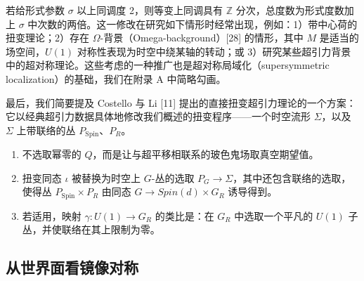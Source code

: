 若给形式参数 $\sigma$ 以上同调度 2，则等变上同调具有 $\mathbb{Z}$ 分次，总度数为形式度数加上 $\sigma$ 中次数的两倍。这一修改在研究如下情形时经常出现，例如：1）带中心荷的扭变理论；2）存在 $\Omega$-背景（Omega-background）[28] 的情形，其中 $M$ 是适当的场空间，$U(1)$ 对称性表现为时空中绕某轴的转动；或 3）研究某些超引力背景中的超对称理论。这些考虑的一种推广也是超对称局域化（supersymmetric localization）的基础，我们在附录 A 中简略勾画。

最后，我们简要提及 Costello 与 Li [11] 提出的直接扭变超引力理论的一个方案：它以经典超引力数据具体地修改我们概述的扭变程序——一个时空流形 $\Sigma$，以及 $\Sigma$ 上带联络的丛 $P_{\mathrm{Spin}}$、$P_R$。

\begin{enumerate}
\item 不选取幂零的 $Q$，而是让与超平移相联系的玻色鬼场取真空期望值。
\item 扭变同态 $\iota$ 被替换为时空上 $G$-丛的选取 $P_G\to\Sigma$，其中还包含联络的选取，使得丛 $P_{\mathrm{Spin}}\times P_R$ 由同态 $G\to Spin(d)\times G_R$ 诱导得到。
\item 若适用，映射 $\gamma:U(1)\to G_R$ 的类比是：在 $G_R$ 中选取一个平凡的 $U(1)$ 子丛，并使联络在其上限制为零。
\end{enumerate}

\subsection{从世界面看镜像对称}

